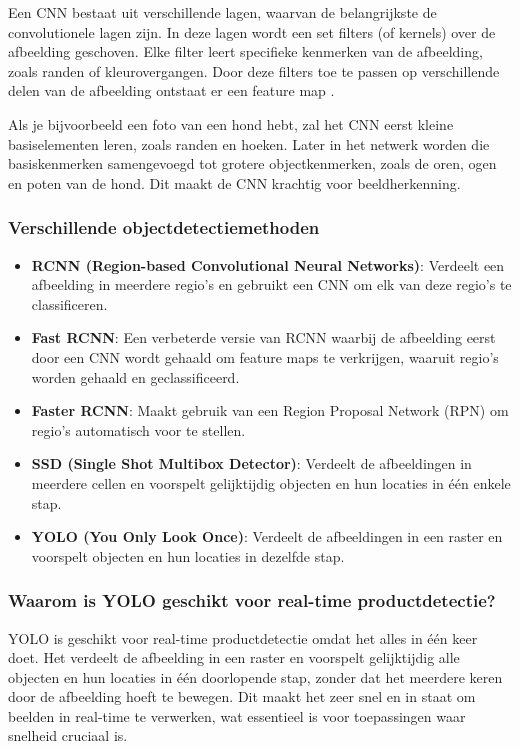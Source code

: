 Een CNN bestaat uit verschillende lagen, waarvan de belangrijkste de convolutionele lagen zijn. In deze lagen wordt een set filters (of kernels) over de afbeelding geschoven. Elke filter leert specifieke kenmerken van de afbeelding, zoals randen of kleurovergangen. Door deze filters toe te passen op verschillende delen van de afbeelding ontstaat er een feature map \autocite{wulteputteefficient}. 

Als je bijvoorbeeld een foto van een hond hebt, zal het CNN eerst kleine basiselementen leren, zoals randen en hoeken. Later in het netwerk worden die basiskenmerken samengevoegd tot grotere objectkenmerken, zoals de oren, ogen en poten van de hond. Dit maakt de CNN krachtig voor beeldherkenning.

\subsubsection{Verschillende objectdetectiemethoden}
\begin{itemize}
    \item \textbf{RCNN (Region-based Convolutional Neural Networks)}: Verdeelt een afbeelding in meerdere regio’s en gebruikt een CNN om elk van deze regio’s te classificeren.
    \item \textbf{Fast RCNN}: Een verbeterde versie van RCNN waarbij de afbeelding eerst door een CNN wordt gehaald om feature maps te verkrijgen, waaruit regio’s worden gehaald en geclassificeerd.
    \item \textbf{Faster RCNN}: Maakt gebruik van een Region Proposal Network (RPN) om regio’s automatisch voor te stellen.
    \item \textbf{SSD (Single Shot Multibox Detector)}: Verdeelt de afbeeldingen in meerdere cellen en voorspelt gelijktijdig objecten en hun locaties in één enkele stap.
    \item \textbf{YOLO (You Only Look Once)}: Verdeelt de afbeeldingen in een raster en voorspelt objecten en hun locaties in dezelfde stap.
\end{itemize}

\subsubsection{Waarom is YOLO geschikt voor real-time productdetectie?}
YOLO is geschikt voor real-time productdetectie omdat het alles in één keer doet. Het verdeelt de afbeelding in een raster en voorspelt gelijktijdig alle objecten en hun locaties in één doorlopende stap, zonder dat het meerdere keren door de afbeelding hoeft te bewegen. Dit maakt het zeer snel en in staat om beelden in real-time te verwerken, wat essentieel is voor toepassingen waar snelheid cruciaal is.

